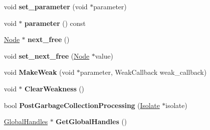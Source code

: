 \begin{DoxyCompactItemize}
\item 
\hypertarget{classv8_1_1internal_1_1_global_handles_1_1_node_a85dffe3db281650c32edf180a0d9d48f}{}void {\bfseries set\+\_\+parameter} (void $\ast$parameter)\label{classv8_1_1internal_1_1_global_handles_1_1_node_a85dffe3db281650c32edf180a0d9d48f}

\item 
\hypertarget{classv8_1_1internal_1_1_global_handles_1_1_node_a9147080ca6f31bdb7c68ffeb1eb8eab4}{}void $\ast$ {\bfseries parameter} () const \label{classv8_1_1internal_1_1_global_handles_1_1_node_a9147080ca6f31bdb7c68ffeb1eb8eab4}

\item 
\hypertarget{classv8_1_1internal_1_1_global_handles_1_1_node_a3c316b1fc6a3d0520e03dd1c81606cbc}{}\hyperlink{classv8_1_1internal_1_1_global_handles_1_1_node}{Node} $\ast$ {\bfseries next\+\_\+free} ()\label{classv8_1_1internal_1_1_global_handles_1_1_node_a3c316b1fc6a3d0520e03dd1c81606cbc}

\item 
\hypertarget{classv8_1_1internal_1_1_global_handles_1_1_node_af10c1ad6d2969bd15bb7843c7beb4452}{}void {\bfseries set\+\_\+next\+\_\+free} (\hyperlink{classv8_1_1internal_1_1_global_handles_1_1_node}{Node} $\ast$value)\label{classv8_1_1internal_1_1_global_handles_1_1_node_af10c1ad6d2969bd15bb7843c7beb4452}

\item 
\hypertarget{classv8_1_1internal_1_1_global_handles_1_1_node_af146205ac78bc2d767d1c00f61069f96}{}void {\bfseries Make\+Weak} (void $\ast$parameter, Weak\+Callback weak\+\_\+callback)\label{classv8_1_1internal_1_1_global_handles_1_1_node_af146205ac78bc2d767d1c00f61069f96}

\item 
\hypertarget{classv8_1_1internal_1_1_global_handles_1_1_node_ad2abb4476219d95838cfb9110030a1e6}{}void $\ast$ {\bfseries Clear\+Weakness} ()\label{classv8_1_1internal_1_1_global_handles_1_1_node_ad2abb4476219d95838cfb9110030a1e6}

\item 
\hypertarget{classv8_1_1internal_1_1_global_handles_1_1_node_af5f7bb202ad8da637eb3bf84f55513a4}{}bool {\bfseries Post\+Garbage\+Collection\+Processing} (\hyperlink{classv8_1_1internal_1_1_isolate}{Isolate} $\ast$isolate)\label{classv8_1_1internal_1_1_global_handles_1_1_node_af5f7bb202ad8da637eb3bf84f55513a4}

\item 
\hypertarget{classv8_1_1internal_1_1_global_handles_1_1_node_a0ca4bb19bd0b3d379861815ab229d656}{}\hyperlink{classv8_1_1internal_1_1_global_handles}{Global\+Handles} $\ast$ {\bfseries Get\+Global\+Handles} ()\label{classv8_1_1internal_1_1_global_handles_1_1_node_a0ca4bb19bd0b3d379861815ab229d656}

\end{DoxyCompactItemize}
